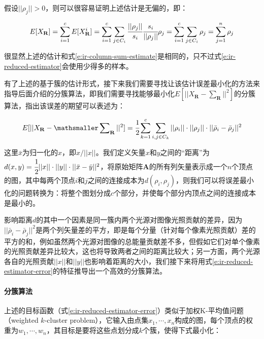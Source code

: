 假设$||\rho_j||>0$，则可以很容易证明上述估计是无偏的，即：

\begin{equation}\label{e:ir-reduced-estimator}
	E[X_{\mathbf{R}}]=\sum^{c}_{i=1}E[X^{i}_{\mathbf{R}}]=\sum^{c}_{i=1}\sum_{j\in C_i} \cfrac{||\rho_j||}{s_i} \cfrac{s_i}{||\rho_j||}\rho_j=\sum^{c}_{i=1}\sum_{j\in C_i}\rho_j=\sum^{n}_{j=1}\rho_j
\end{equation}

\noindent 很显然上述的估计和式\ref{e:ir-column-sum-estimate}是相同的，只不过式\ref{e:ir-reduced-estimator}会使用少得多的样本。

有了上述的基于簇的估计形式，接下来我们需要寻找让该估计误差最小化的方法来指导后面介绍的分簇算法，即我们需要寻找能够最小化$E[||X_{\mathbf{R}}-\sum_{\mathbf{R}}||^{2}]$的分簇算法，\cite{a:MatrixRow-ColumnSamplingfortheMany-LightProblem}指出该误差的期望可以表述为：

\begin{equation}\label{e:ir-reduced-estimator-error}
	E[||X_{\mathbf{R}}-\mathsmaller\sum\nolimits_ {\mathbf{R}}||^{2}]= \cfrac{1}{2}\sum^{c}_{k=1}\sum_{i,j\in C_k}||\rho_i||\cdot ||\rho_j||\cdot||\bar{\rho}_i-\bar{\rho}_j||^{2}
\end{equation}

\noindent 这里$\bar{x}$为归一化的$x$，即$x/||x||$。我们定义矢量$x$和$y$之间的“距离”为$d(x,y)= \cfrac{1}{2}||x||\cdot||y||\cdot||\bar{x}-\bar{y}||^{2}$，将原始矩阵$\mathbf{A}$的所有列矢量表示成一个$n$个顶点的图，其中每两个顶点$i$和$j$之间的连接成本为$d(\rho_i,\rho_j)$，则我们可以将误差最小化的问题转换为：将整个图划分成$c$个部分，并使每个部分内顶点之间的连接成本是最小的。

影响距离$d$的其中一个因素是同一簇内两个光源对图像光照贡献的差异，因为$||\bar{\rho}_i-\bar{\rho}_j||^{2}$是两个列矢量差的平方，即是每个分量（针对每个像素光照贡献）差的平方的和，例如虽然两个光源对图像的总能量贡献差不多，但假如它们对单个像素的光照贡献差异比较大，这也将导致两者之间的距离比较大；另一方面，两个光源各自的光照贡献$||x||$和$||y||$也影响着距离的大小，我们接下来将用式\ref{e:ir-reduced-estimator-error}的特征推导出一个高效的分簇算法。




\paragraph{分簇算法}
上述的目标函数（式\ref{e:ir-reduced-estimator-error}）类似于加权K-平均值问题（weighted $k$-cluster problem），它输入由点集$x_1,\cdots,x_n$构成的图，每个顶点的权重为$w_1,\cdots,w_n$，其目标是要将这些点划分成$k$个簇，使得下式最小化：


